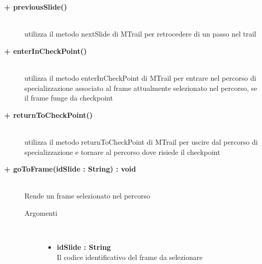 \begin{description}
	\begin{description}
		\item[\textbf{\color{blue}+ previousSlide()			}] \hfill \\
			utilizza il metodo nextSlide di MTrail per retrocedere di un passo nel trail
	\end{description}
	
	\begin{description}
		\item[\textbf{\color{blue}+ enterInCheckPoint()			}] \hfill \\
			utilizza il metodo enterInCheckPoint di MTrail per entrare nel percorso di specializzazione associato al frame attualmente selezionato nel percorso, se il frame funge da checkpoint
	\end{description}
	
	\begin{description}
		\item[\textbf{\color{blue}+ returnToCheckPoint()			}] \hfill \\
			utilizza il metodo returnToCheckPoint di MTrail per uscire dal percorso di specializzazione e tornare al percorso dove risiede il checkpoint
	\end{description}
	
	\begin{description}
		\item[\textbf{\color{blue}+ goToFrame(idSlide : String) : void			}] \hfill \\
			Rende un frame selezionato nel percorso
			
		\begin{description}
			\item[Argomenti] \hfill \\
				\begin{itemize}
				
					\item \textbf{idSlide : String			} \hfill \\
					Il codice identificativo del frame da selezionare
					
				\end{itemize}
			
		\end{description}
	\end{description}
	

\end{description}
